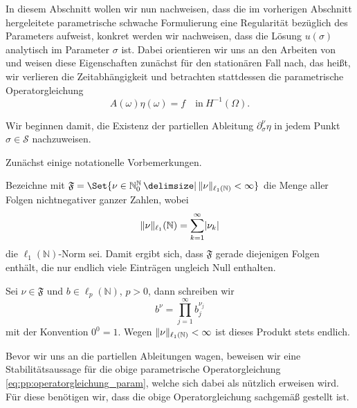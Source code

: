In diesem Abschnitt wollen wir nun nachweisen, dass die im vorherigen Abschnitt hergeleitete parametrische schwache Formulierung eine Regularität bezüglich des Parameters aufweist, konkret werden wir nachweisen, dass die Lösung $u(\sigma)$ analytisch im Parameter $\sigma$ ist.
Dabei orientieren wir uns an den Arbeiten von \textcite{Cohen:2010kz,Kunoth:2013ef} und weisen diese Eigenschaften zunächst für den stationären Fall nach, das heißt, wir verlieren die Zeitabhängigkeit und betrachten stattdessen die parametrische Operatorgleichung
\begin{equation}
\label{eq:pp:operatorgleichung_param}
    A(\omega) \eta(\omega) = f \quad \text{in}~H^{-1}(\Omega).
\end{equation}

Wir beginnen damit, die Existenz der partiellen Ableitung $\partial^{\nu}_{\sigma} \eta$ in jedem Punkt $\sigma \in \mathcal S$ nachzuweisen.

Zunächst einige notationelle Vorbemerkungen.
\begin{Bemerkung}
    Bezeichne mit $\mathfrak F = \Set{ \nu \in \mathbb{N}^{\mathbb{N}}_{0} \given \norm{\nu}_{\ell_{1}(\mathbb{N})} < \infty }$ die Menge aller Folgen nichtnegativer ganzer Zahlen, wobei
    \begin{equation}
        \lVert\nu\rVert_{\ell_{1}}(\mathbb{N}) = \sum_{k = 1}^{\infty} \lvert\nu_{k}\rvert
    \end{equation}
    die $\ell_{1}(\mathbb{N})$-Norm sei.
    Damit ergibt sich, dass $\mathfrak F$ gerade diejenigen Folgen enthält, die nur endlich viele Einträgen ungleich Null enthalten.

    Sei $\nu \in \mathfrak F$ und $b \in \ell_{p}(\mathbb{N})$, $p > 0$, dann schreiben wir
    \begin{equation}
        b^{\nu} = \prod_{j = 1}^{\infty} b_{j}^{\nu_{j}}
    \end{equation}
    mit der Konvention $0^{0} = 1$.
    Wegen $\lVert\nu\rVert_{\ell_{1}(\mathbb{N})} < \infty$ ist dieses Produkt stets endlich.
\end{Bemerkung}

Bevor wir uns an die partiellen Ableitungen wagen, beweisen wir eine Stabilitätsaussage für die obige parametrische Operatorgleichung \eqref{eq:pp:operatorgleichung_param}, welche sich dabei als nützlich erweisen wird.
Für diese benötigen wir, dass die obige Operatorgleichung sachgemäß gestellt ist.

